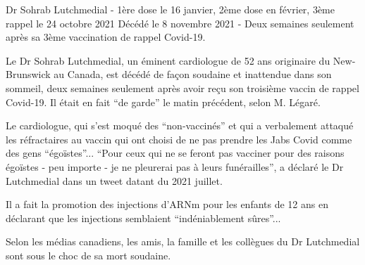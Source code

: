 Dr Sohrab Lutchmedial - 1ère dose le 16 janvier, 2ème dose en février, 3ème
rappel le 24 octobre 2021 Décédé le 8 novembre 2021 - Deux semaines seulement
après sa 3ème vaccination de rappel Covid-19.

Le Dr Sohrab Lutchmedial, un éminent cardiologue de 52 ans originaire du
New-Brunswick au Canada, est décédé de façon soudaine et inattendue dans son
sommeil, deux semaines seulement après avoir reçu son troisième vaccin de rappel
Covid-19. Il était en fait ``de garde'' le matin précédent, selon M. Légaré.

Le cardiologue, qui s'est moqué des ``non-vaccinés'' et qui a verbalement
attaqué les réfractaires au vaccin qui ont choisi de ne pas prendre les Jabs
Covid comme des gens ``égoïstes''... ``Pour ceux qui ne se feront pas vacciner
pour des raisons égoïstes - peu importe - je ne pleurerai pas à leurs
funérailles'', a déclaré le Dr Lutchmedial dans un tweet datant du 2021 juillet.

Il a fait la promotion des injections d'ARNm pour les enfants de 12 ans en
déclarant que les injections semblaient ``indéniablement sûres''...

Selon les médias canadiens, les amis, la famille et les collègues du Dr
Lutchmedial sont sous le choc de sa mort soudaine.
